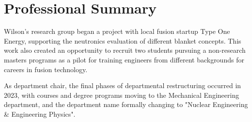 \section{Professional Summary}

Wilson's research group began a project with local fusion startup Type One
Energy, supporting the neutronics evaluation of different blanket concepts. This
work also created an opportunity to recruit two students pursuing a non-research
masters programs as a pilot for training engineers from different backgrounds
for careers in fusion technology.

As department chair, the final phases of departmental restructuring occurred in
2023, with courses and degree programs moving to the Mechanical Engineering
department, and the department name formally changing to "Nuclear Engineering \&
Engineering Physics".